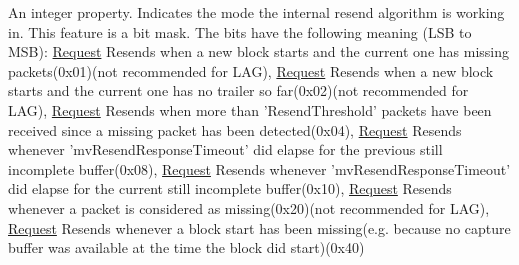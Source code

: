 An integer property. Indicates the mode the internal resend algorithm is working in. This feature is a bit mask. The bits have the following meaning (L\+S\+B to M\+S\+B)\+: \hyperlink{classmv_i_m_p_a_c_t_1_1acquire_1_1_request}{Request} Resends when a new block starts and the current one has missing packets(0x01)(not recommended for L\+A\+G), \hyperlink{classmv_i_m_p_a_c_t_1_1acquire_1_1_request}{Request} Resends when a new block starts and the current one has no trailer so far(0x02)(not recommended for L\+A\+G), \hyperlink{classmv_i_m_p_a_c_t_1_1acquire_1_1_request}{Request} Resends when more than 'Resend\+Threshold' packets have been received since a missing packet has been detected(0x04), \hyperlink{classmv_i_m_p_a_c_t_1_1acquire_1_1_request}{Request} Resends whenever 'mv\+Resend\+Response\+Timeout' did elapse for the previous still incomplete buffer(0x08), \hyperlink{classmv_i_m_p_a_c_t_1_1acquire_1_1_request}{Request} Resends whenever 'mv\+Resend\+Response\+Timeout' did elapse for the current still incomplete buffer(0x10), \hyperlink{classmv_i_m_p_a_c_t_1_1acquire_1_1_request}{Request} Resends whenever a packet is considered as missing(0x20)(not recommended for L\+A\+G), \hyperlink{classmv_i_m_p_a_c_t_1_1acquire_1_1_request}{Request} Resends whenever a block start has been missing(e.\+g. because no capture buffer was available at the time the block did start)(0x40) 

